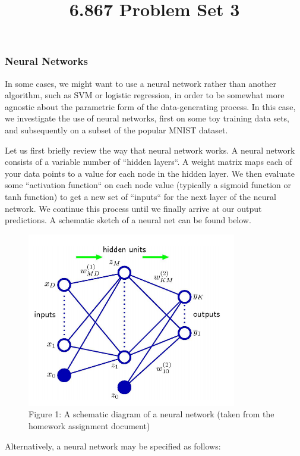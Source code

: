 \documentclass[10pt]{article}
\begin{document}
	\title{6.867 Problem Set 3}
	\maketitle
	
\subsubsection*{Neural Networks}

In some cases, we might want to use a neural network rather than another algorithm, such as SVM or logistic regression, in order to be somewhat more agnostic about the parametric form of the data-generating process. In this case, we investigate the use of neural networks, first on some toy training data sets, and subsequently on a subset of the popular MNIST dataset.

Let us first briefly review the way that neural network works. A neural network consists of a variable number of ``hidden layers``. A weight matrix maps each of your data points to a value for each node in the hidden layer. We then evaluate some ``activation function`` on each node value (typically a sigmoid function or tanh function) to get a new set of ``inputs`` for the next layer of the neural network. We continue this process until we finally arrive at our output predictions.  A schematic sketch of a neural net can be found below.

\begin{figure}[ht]
	\centering
	\includegraphics[height=3in]{neuralnetdiagram.png}
	\caption*{Figure 1: A schematic diagram of a neural network (taken from the homework assignment document)}
\end{figure}

Alternatively, a neural network may be specified as follows:
\end{document}
